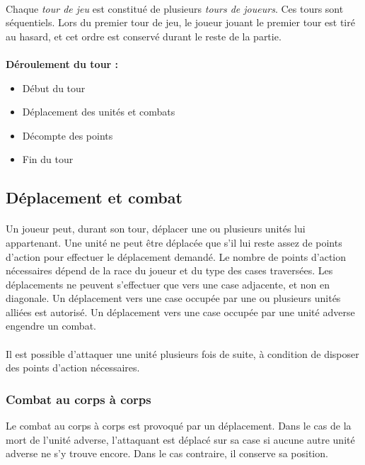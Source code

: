 \documentclass[a4paper]{article}
\begin{document}
\paragraph{}
Chaque \textit{tour de jeu} est constitué de plusieurs \textit{tours de joueurs}. Ces tours sont séquentiels. Lors du premier tour de jeu, le joueur jouant le premier tour est tiré au hasard, et cet ordre est conservé durant le reste de la partie.

\paragraph{}
\textbf{Déroulement du tour : }
\begin{itemize}
    \item Début du tour
    \item Déplacement des unités et combats
    \item Décompte des points
    \item Fin du tour
\end{itemize}

\subsection{Déplacement et combat}
\paragraph{}
Un joueur peut, durant son tour, déplacer une ou plusieurs unités lui appartenant. Une unité ne peut être déplacée que s'il lui reste assez de points d'action pour effectuer le déplacement demandé. Le nombre de points d'action nécessaires dépend de la race du joueur et du type des cases traversées. Les déplacements ne peuvent s'effectuer que vers une case adjacente, et non en diagonale. Un déplacement vers une case occupée par une ou plusieurs unités alliées est autorisé. Un déplacement vers une case occupée par une unité adverse engendre un combat.

\paragraph{}
Il est possible d'attaquer une unité plusieurs fois de suite, à condition de disposer des points d'action nécessaires.

\subsubsection{Combat au corps à corps}
Le combat au corps à corps est provoqué par un déplacement. Dans le cas de la mort de l'unité adverse, l'attaquant est déplacé sur sa case si aucune autre unité adverse ne s'y trouve encore. Dans le cas contraire, il conserve sa position.
\end{document}
